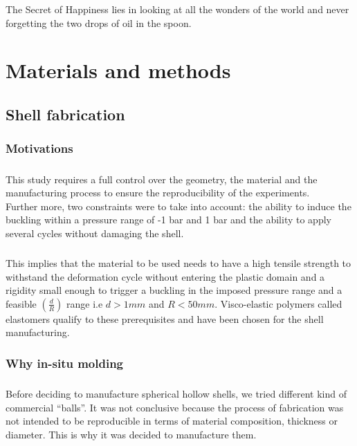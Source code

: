 \begin{savequote}[75mm]
The Secret of Happiness lies in looking at all the wonders of the world and never forgetting the two drops of oil in the spoon.
\end{savequote}

\chapter{Materials and methods}

\section{Shell fabrication}
\subsection{Motivations}
\paragraph{}
This study requires a full control over the geometry, the material and the manufacturing process to ensure the reproducibility of the experiments.\\
Further more, two constraints were to take into account: the ability to induce the buckling within a pressure range of -1 bar and 1 bar and the ability to apply several cycles without damaging the shell. 
\paragraph{}This implies that the material to be used needs to have a high tensile strength to withstand the deformation cycle without entering the plastic domain and a rigidity small enough to trigger a buckling in the imposed pressure range and a feasible $(\frac{d}{R})$ range i.e $d > 1 mm$ and $R < 50 mm$. Visco-elastic polymers called elastomers qualify to these prerequisites and have been chosen for the shell manufacturing.
\subsection{Why in-situ molding}
\paragraph{}
Before deciding to manufacture spherical hollow shells, we tried different kind of commercial "`balls"'. It was not conclusive because the process of fabrication was not intended to be reproducible in terms of material composition, thickness or diameter. This is why it was decided to manufacture them.

